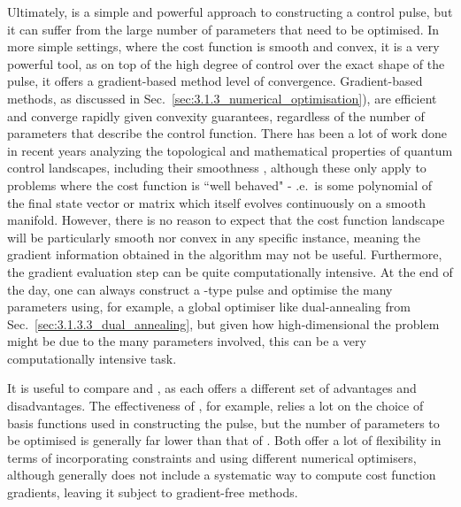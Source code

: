 Ultimately,  is a simple and powerful approach to constructing a control pulse, but it can suffer from the large number of parameters that need to be optimised. In more simple settings, where the cost function is smooth and convex, it is a very powerful tool, as on top of the high degree of control over the exact shape of the pulse, it offers a gradient-based method level of convergence. Gradient-based methods, as discussed in Sec.~\ref{sec:3.1.3_numerical_optimisation}), are efficient and converge rapidly given convexity guarantees, regardless of the number of parameters that describe the control function. There has been a lot of work done in recent years analyzing the topological and mathematical properties of quantum control landscapes, including their smoothness \cite{chakrabarti_quantum_2007, rabitz_surprising_2023,dong_quantum_2022}, although these only apply to problems where the cost function is ``well behaved" - \@i.e.~is some polynomial of the final state vector or matrix which itself evolves continuously on a smooth manifold.  However, there is no reason to expect that the cost function landscape will be particularly smooth nor convex in any specific instance, meaning the gradient information obtained in the  algorithm may not be useful. Furthermore, the gradient evaluation step can be quite computationally intensive. At the end of the day, one can always construct a -type pulse and optimise the many parameters using, for example, a global optimiser like dual-annealing from Sec.~\ref{sec:3.1.3.3_dual_annealing}, but given how high-dimensional the problem might be due to the many parameters involved, this can be a very computationally intensive task.

It is useful to compare  and , as each offers a different set of advantages and disadvantages. The effectiveness of , for example, relies a lot on the choice of basis functions used in constructing the pulse, but the number of parameters to be optimised is generally far lower than that of . Both offer a lot of flexibility in terms of incorporating constraints and using different numerical optimisers, although  generally does not include a systematic way to compute cost function gradients, leaving it subject to gradient-free methods. 